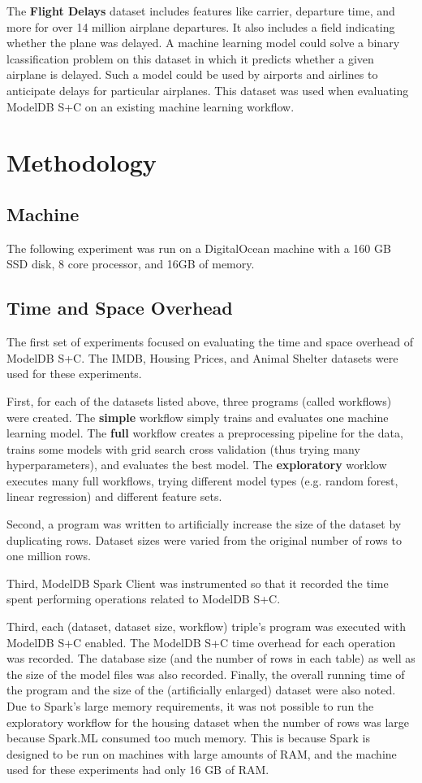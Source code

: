 The \textbf{Flight Delays} dataset \cite{airline} includes features like carrier, departure
time, and more for over 14 million airplane departures. It also includes a field indicating whether
the plane was delayed. A machine learning model could solve a binary lcassification problem on this dataset in which
it predicts whether a given airplane is delayed. Such a model could be used by airports and airlines
to anticipate delays for particular airplanes. This dataset was used when evaluating ModelDB S+C
on an existing machine learning workflow.

\section{Methodology}
\subsection{Machine}
The following experiment was run on a DigitalOcean machine with a 160 GB SSD disk, 8 core processor,
and 16GB of memory.

\subsection{Time and Space Overhead}
The first set of experiments focused on evaluating the time and space overhead of ModelDB S+C.
The IMDB, Housing Prices, and Animal Shelter datasets were used for these experiments. 

First, for each of the datasets listed above, three programs (called workflows) were
created. The \textbf{simple} workflow simply trains and evaluates one machine learning model. 
The \textbf{full} workflow creates a preprocessing pipeline for the data, trains 
some models with grid search cross validation (thus trying many hyperparameters), 
and evaluates the best model. The \textbf{exploratory} worklow executes many full workflows, 
trying different model types (e.g. random forest, linear regression) and different feature sets.

Second, a program was written to artificially increase the size of the dataset by duplicating rows.
Dataset sizes were varied from the original number of rows to one million rows.

Third, ModelDB Spark Client was instrumented so that it recorded the time spent performing operations related
to ModelDB S+C.

Third, each (dataset, dataset size, workflow) triple's program was executed with ModelDB S+C enabled. The ModelDB S+C time overhead
for each operation was recorded. The database size (and the number of rows in each table) as well as the size of the model
files was also recorded. Finally, the overall running time of the program and the size of the (artificially enlarged) dataset
were also noted. Due to Spark's large memory requirements, it was not possible to run the exploratory workflow for the 
housing dataset when the number of rows was large because Spark.ML consumed too much memory. This is because Spark is designed
to be run on machines with large amounts of RAM, and the machine used for these experiments had only 16 GB of RAM.

